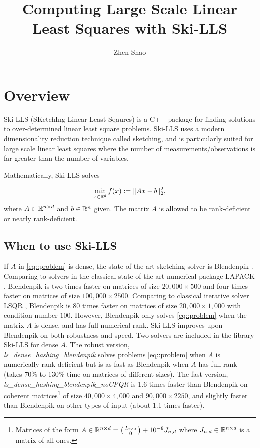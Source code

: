 \documentclass[english,11pt]{article}
\begin{document}
\title{Computing Large Scale Linear Least Squares with Ski-LLS}

\author{Zhen Shao}\maketitle

\section{Overview}

Ski-LLS (SKetchIng-Linear-Least-Sqaures) is a C++ package for finding solutions to over-determined linear least square problems. Ski-LLS uses a modern dimensionality reduction technique called sketching, and is particularly suited for large scale linear least squares where the number of measurements/observations is far greater than the number of variables. 

Mathematically, Ski-LLS solves

\begin{align}
\min_{x \in \mathbb{R}^{d}} f(x): = \|Ax - b\|_2^2, \label{eq::problem}
\end{align}
where $A \in \mathbb{R}^{n\times d}$ and $b \in \mathbb{R}^{n}$ given. The matrix $A$ is allowed to be rank-deficient or nearly rank-deficient. 

\subsection{When to use Ski-LLS}

If $A$ in \eqref{eq::problem} is dense, the state-of-the-art sketching solver is Blendenpik \cite{doi:10.1137/090767911}. Comparing to solvers in the classical state-of-the-art numerical package LAPACK \cite{laug}, Blendenpik is two times faster on matrices of size $20,000 \times 500$ and four times faster on matrices of size $100,000 \times 2500$. Comparing to classical iterative solver LSQR \cite{Paige:1982aa}, Blendenpik is 80 times faster on matrices of size $20,000 \times 1,000$ with condition number $100$. However, Blendenpik only solves \eqref{eq::problem} when the matrix $A$ is dense, and has full numerical rank. Ski-LLS improves upon Blendenpik on both robustness and speed. Two solvers are included in the library Ski-LLS for dense $A$. The robust version, \\{\it{ls_dense_hashing_blendenpik} }solves problems \eqref{eq::problem} when $A$ is numerically rank-deficient but is as fast as Blendenpik when $A$ has full rank (takes 70\% to 130\% time on matrices of different sizes). The fast version, {\it{ls_dense_hashing_blendenpik_noCPQR}} is 1.6 times faster than Blendenpik on coherent matrices\footnote{Matrices of the form $A \in \mathbb{R}^{n\times d} = \bigl(\begin{smallmatrix} I_{d\times d} \\ 0  \end{smallmatrix}\bigr) + 10^{-8}J_{n,d} $ where $J_{n,d} \in \mathbb{R}^{n \times d}$ is a matrix of all ones.} of size $40,000 \times 4,000$ and $90,000 \times 2250$, and slightly faster than Blendenpik on other types of input (about 1.1 times faster).
\end{document}
